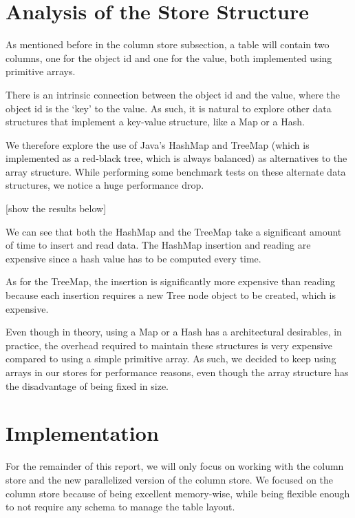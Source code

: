 \documentclass[11pt,journal,compsoc]{IEEEtran}
\begin{document}
\section{Analysis of the Store Structure}
As mentioned before in the column store subsection, a table will contain two columns, one for the object id and one for the value, both implemented using primitive arrays.

There is an intrinsic connection between the object id and the value, where the object id is the ‘key’ to the value. As such, it is natural to explore other data structures that implement a key-value structure, like a Map or a Hash.

We therefore explore the use of Java’s HashMap and TreeMap (which is implemented as a red-black tree, which is always balanced) as alternatives to the array structure. While performing some benchmark tests on these alternate data structures, we notice a huge performance drop.


[show the results below]

We can see that both the HashMap and the TreeMap take a significant amount of time to insert and read data. The HashMap insertion and reading are expensive since a hash value has to be computed every time.

As for the TreeMap, the insertion is significantly more expensive than reading because each insertion requires a new Tree node object to be created, which is expensive.

Even though in theory, using a Map or a Hash has a architectural desirables, in practice, the overhead required to maintain these structures is very expensive compared to using a simple primitive array. As such, we decided to keep using arrays in our stores for performance reasons, even though the array structure has the disadvantage of being fixed in size.

\section{Implementation}

For the remainder of this report, we will only focus on working with the column store and the new parallelized version of the column store. We focused on the column store because of being excellent memory-wise, while being flexible enough to not require any schema to manage the table layout.
\end{document}
